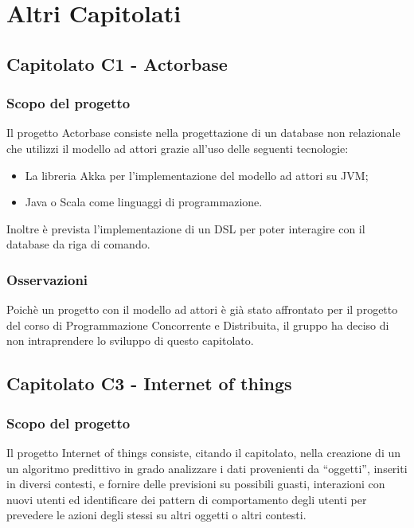 \section{Altri Capitolati}

\subsection{Capitolato C1 - Actorbase}
\subsubsection{Scopo del progetto}

Il progetto Actorbase consiste nella progettazione di un database non relazionale che utilizzi il modello ad attori grazie all'uso delle seguenti tecnologie:
\begin{itemize}
	\item La libreria Akka per l'implementazione del modello ad attori su JVM;
	\item Java o Scala come linguaggi di programmazione.
\end{itemize}
Inoltre è prevista l'implementazione di un DSL per poter interagire con il database da riga di comando.

\subsubsection{Osservazioni}
Poichè un progetto con il modello ad attori è già stato affrontato per il progetto del corso di Programmazione Concorrente e Distribuita, il gruppo ha deciso di
non intraprendere lo sviluppo di questo capitolato.


\subsection{Capitolato C3 - Internet of things}
\subsubsection{Scopo del progetto}

Il progetto Internet of things consiste, citando il capitolato, nella creazione di un un algoritmo predittivo in grado analizzare i dati provenienti da “oggetti”, inseriti
in diversi contesti, e fornire delle previsioni su possibili guasti, interazioni con nuovi utenti ed identificare dei pattern di comportamento degli utenti per prevedere le azioni degli
stessi su altri oggetti o altri contesti.

